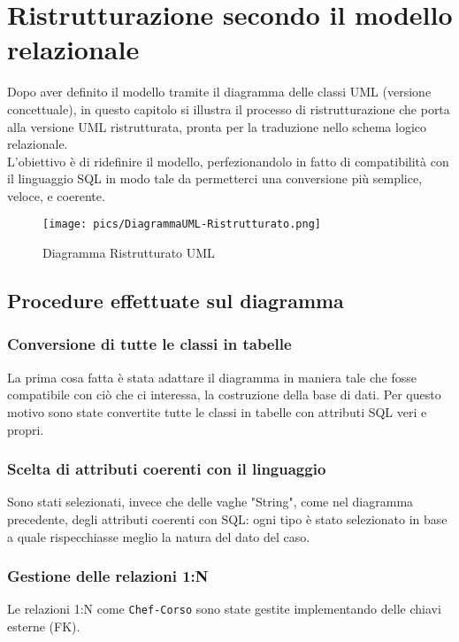 \documentclass[a4paper, 12pt]{article}
\begin{document}
\section{Ristrutturazione secondo il modello relazionale}
    Dopo aver definito il modello tramite il diagramma delle classi UML (versione concettuale), in questo capitolo si illustra il processo di ristrutturazione che porta alla versione UML ristrutturata, pronta per la traduzione nello schema logico relazionale.\\[0.2cm]
    L'obiettivo è di ridefinire il modello, perfezionandolo in fatto di compatibilità con il linguaggio SQL in modo tale da permetterci una conversione più semplice, veloce, e coerente.

    \begin{figure}[H]
        \centering
        \texttt{[image: pics/DiagrammaUML-Ristrutturato.png]}
        \caption{\label{fig:DiagrammaUMLRistrutturato}Diagramma Ristrutturato UML}
    \end{figure}

    \subsection{Procedure effettuate sul diagramma}
        \subsubsection{Conversione di tutte le classi in tabelle} La prima cosa fatta è stata adattare il diagramma in maniera tale che fosse compatibile con ciò che ci interessa, la costruzione della base di dati. Per questo motivo sono state convertite tutte le classi in tabelle con attributi SQL veri e propri.
    
        \subsubsection{Scelta di attributi coerenti con il linguaggio} Sono stati selezionati, invece che delle vaghe "String", come nel diagramma precedente, degli attributi coerenti con SQL: ogni tipo è stato selezionato in base a quale rispecchiasse meglio la natura del dato del caso.
    
        \subsubsection{Gestione delle relazioni 1:N} Le relazioni 1:N come \texttt{Chef-Corso} sono state gestite implementando delle chiavi esterne (FK).
    
\end{document}
